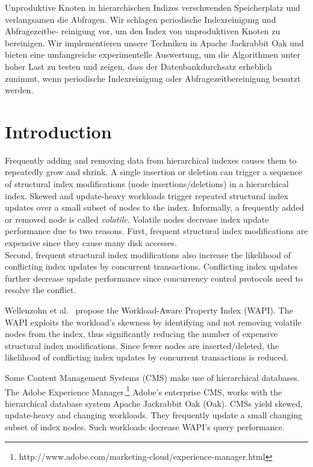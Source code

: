 \documentclass[abstracton,12pt]{scrartcl}
\theoremstyle{definition}
\begin{document}
Unproduktive Knoten in hierarchischen Indizes verschwenden Speicherplatz und
verlangsamen die Abfragen. Wir schlagen periodische Indexreinigung
und Abfragezeitbe- reinigung vor, um den Index von unproduktiven Knoten zu
bereinigen. Wir implementieren
unsere Techniken in Apache Jackrabbit Oak und bieten eine umfangreiche
experimentelle Auswertung, um die Algorithmen unter hoher Last zu testen und
zeigen, dass der Datenbankdurchsatz erheblich zunimmt, wenn periodische
Indexreinigung oder Abfragezeitbereinigung benutzt werden.

\newpage
\thispagestyle{empty}

\tableofcontents

\newpage
\thispagestyle{empty}

\listoffigures

\newpage


\section{Introduction}

Frequently adding and removing data from hierarchical indexes causes them to
repeatedly grow and shrink. A single insertion or deletion can trigger a
sequence of structural index modifications (node insertions/deletions) in a
hierarchical index. Skewed and update-heavy workloads trigger repeated
structural index updates over a small subset of nodes to the index.
Informally, a frequently added or removed node is called \textit{volatile}.
Volatile nodes decrease index update performance due to two reasons. First,
frequent structural index modifications are expensive since they cause many disk
accesses. \\ Second, frequent structural index modifications also increase the
likelihood of conflicting index updates by concurrent transactions. Conflicting
index updates further decrease update performance since concurrency control
protocols need to resolve the conflict.

Wellenzohn et al.~\cite{KW17} propose the Workload-Aware Property Index (WAPI).
The WAPI exploits the workload's skewness by identifying and not removing
volatile nodes from the index, thus significantly reducing the number of
expensive structural index modifications. Since fewer nodes are
inserted/deleted, the likelihood of conflicting index updates by concurrent
transactions is reduced.

Some Content Management Systems (CMS) make use of hierarchical 
databases. The Adobe Experience
Manager,\footnote{http://www.adobe.com/marketing-cloud/experience-manager.html}
Adobe's enterprise CMS, works with the hierarchical database system Apache
Jackrabbit Oak (Oak). CMSs yield skewed, update-heavy and changing
workloads. They frequently update a small changing subset of index nodes. Such
workloads decrease WAPI's query performance.
\end{document}
